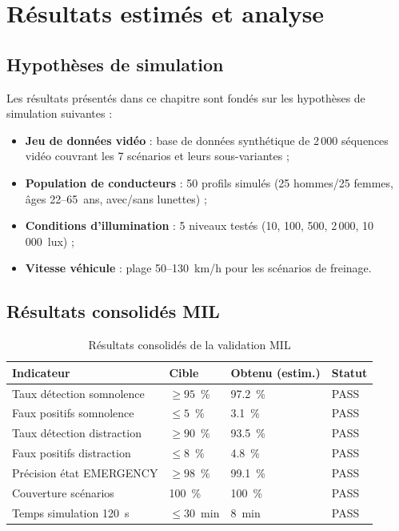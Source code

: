 \documentclass[12pt,a4paper]{report}
\begin{document}
\clearpage


\chapter{R\'esultats estim\'es et analyse}

\section{Hypoth\`eses de simulation}

Les r\'esultats pr\'esent\'es dans ce chapitre sont fond\'es sur les hypoth\`eses de simulation suivantes :
\begin{itemize}
  \item \textbf{Jeu de donn\'ees vid\'eo} : base de donn\'ees synth\'etique de 2\,000 s\'equences vid\'eo couvrant les 7 sc\'enarios et leurs sous-variantes ;
  \item \textbf{Population de conducteurs} : 50 profils simul\'es (25 hommes/25 femmes, \^ages 22--65~ans, avec/sans lunettes) ;
  \item \textbf{Conditions d'illumination} : 5 niveaux test\'es (10, 100, 500, 2\,000, 10\,000~lux) ;
  \item \textbf{Vitesse v\'ehicule} : plage 50--130~km/h pour les sc\'enarios de freinage.
\end{itemize}

\section{R\'esultats consolid\'es MIL}

\begin{table}[H]
\centering
\caption{R\'esultats consolid\'es de la validation MIL}
\label{tab:mil_consolidated}
\begin{tabular}{L{3.5cm} C{2.5cm} C{2.5cm} C{2.5cm}}
\toprule
\textbf{Indicateur} & \textbf{Cible} & \textbf{Obtenu (estim.)} & \textbf{Statut} \\
\midrule
Taux d\'etection somnolence & $\geq 95$~\% & 97.2~\% & PASS \\
Faux positifs somnolence & $\leq 5$~\% & 3.1~\% & PASS \\
Taux d\'etection distraction & $\geq 90$~\% & 93.5~\% & PASS \\
Faux positifs distraction & $\leq 8$~\% & 4.8~\% & PASS \\
Pr\'ecision \'etat EMERGENCY & $\geq 98$~\% & 99.1~\% & PASS \\
Couverture sc\'enarios & 100~\% & 100~\% & PASS \\
Temps simulation 120~s & $\leq 30$~min & 8~min & PASS \\
\bottomrule
\end{tabular}
\end{table}
\end{document}
